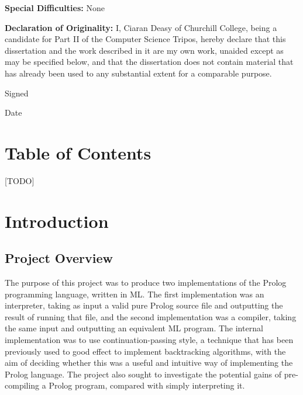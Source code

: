 \documentclass[12pt]{article}
\begin{document}
\vspace{0.25in}

{\bf Special Difficulties:} None

{\bf Declaration of Originality:}
I, Ciaran Deasy of Churchill College, being a candidate for Part II of the Computer Science Tripos, hereby declare that this dissertation and the work described in it are my own work, unaided except as may be specified below, and that the dissertation does not contain material that has already been used to any substantial extent for a comparable purpose. 

Signed %

Date %

\vfil
\eject

\section*{Table of Contents}

[TODO]

\newpage

\section{Introduction}



\subsection{Project Overview}

The purpose of this project was to produce two implementations of the Prolog programming language, written in ML. 
The first implementation was an interpreter, taking as input a valid pure Prolog source file and outputting the result of running that file, and the second implementation was a compiler, taking the same input and outputting an equivalent ML program. 
The internal implementation was to use continuation-passing style, a technique that has been previously used to good effect to implement backtracking algorithms, with the aim of deciding whether this was a useful and intuitive way of implementing the Prolog language. 
The project also sought to investigate the potential gains of pre-compiling a Prolog program, compared with simply interpreting it.
\end{document}
